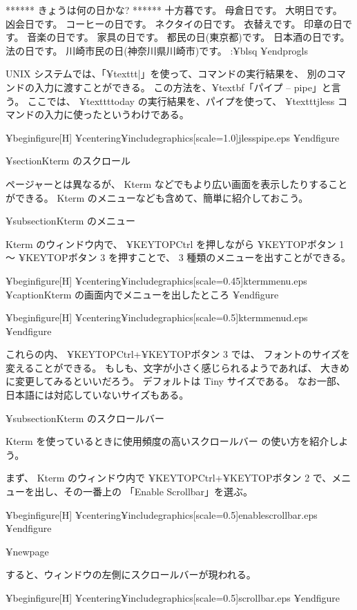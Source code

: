 ****** きょうは何の日かな? ******
十方暮です。
母倉日です。
大明日です。
凶会日です。
コーヒーの日です。
ネクタイの日です。
衣替えです。
印章の日です。
音楽の日です。
家具の日です。
都民の日(東京都)です。
日本酒の日です。
法の日です。
川崎市民の日(神奈川県川崎市)です。
:¥blsq
¥end{progls}

 UNIX システムでは、「¥texttt{|}」を使って、コマンドの実行結果を、
別のコマンドの入力に渡すことができる。
この方法を、¥textbf{「パイプ -- pipe」}と言う。
ここでは、 ¥texttt{today} の実行結果を、パイプを使って、
 ¥texttt{jless} コマンドの入力に使ったというわけである。

¥begin{figure}[H]
¥centering{¥includegraphics[scale=1.0]{jlesspipe.eps}}
¥end{figure}

¥section{Kterm のスクロール}

ページャーとは異なるが、
 Kterm などでもより広い画面を表示したりすることができる。
 Kterm のメニューなども含めて、簡単に紹介しておこう。

¥subsection{Kterm のメニュー}

Kterm のウィンドウ内で、
¥KEYTOP{Ctrl} を押しながら ¥KEYTOP{ボタン 1} 〜 ¥KEYTOP{ボタン 3}
を押すことで、
 3 種類のメニューを出すことができる。

¥begin{figure}[H]
¥centering{¥includegraphics[scale=0.45]{ktermmenu.eps}}
¥caption{Kterm の画面内でメニューを出したところ}
¥end{figure}

¥begin{figure}[H]
¥centering{¥includegraphics[scale=0.5]{ktermmenud.eps}}
¥end{figure}

これらの内、 ¥KEYTOP{Ctrl}+¥KEYTOP{ボタン 3} では、
フォントのサイズを変えることができる。
もしも、文字が小さく感じられるようであれば、
大きめに変更してみるといいだろう。
デフォルトは Tiny サイズである。
なお一部、日本語には対応していないサイズもある。

¥subsection{Kterm のスクロールバー}

Kterm を使っているときに使用頻度の高いスクロールバー
の使い方を紹介しよう。

まず、 Kterm のウィンドウ内で ¥KEYTOP{Ctrl}+¥KEYTOP{ボタン 2}
で、メニューを出し、その一番上の
「Enable Scrollbar」を選ぶ。

¥begin{figure}[H]
¥centering{¥includegraphics[scale=0.5]{enablescrollbar.eps}}
¥end{figure}

¥newpage

すると、ウィンドウの左側にスクロールバーが現われる。

¥begin{figure}[H]
¥centering{¥includegraphics[scale=0.5]{scrollbar.eps}}
¥end{figure}

